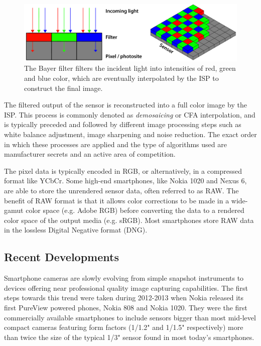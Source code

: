 \documentclass[thesis.tex]{subfiles}
\begin{document}
\begin{figure}[h]
\centering \includegraphics[width=\textwidth]{images/bayer}
\caption{The Bayer filter filters the incident light into intensities of red, green and blue color, which are eventually interpolated by the ISP to construct the final image. \label{figure:bayer}}
\end{figure}

The filtered output of the sensor is reconstructed into a full color image by the ISP. This process is commonly denoted as \textit{demosaicing} or CFA interpolation, and is typically preceded and followed by different image processing steps such as white balance adjustment, image sharpening and noise reduction. The exact order in which these processes are applied and the type of algorithms used are manufacturer secrets and an active area of competition.

The pixel data is typically encoded in RGB, or alternatively, in a compressed format like YCbCr. Some high-end smartphones, like Nokia 1020 and Nexus 6, are able to store the unrendered sensor data, often referred to as RAW. The benefit of RAW format is that it allows color corrections to be made in a wide-gamut color space (e.g. Adobe RGB) before converting the data to a rendered color space of the output media (e.g. sRGB). Most smartphones store RAW data in the lossless Digital Negative format (DNG).

\subsection{Recent Developments}\label{chapter:solutions}

Smartphone cameras are slowly evolving from simple snapshot instruments to devices offering near professional quality image capturing capabilities. The first steps towards this trend were taken during 2012-2013 when Nokia released its first PureView powered phones, Nokia 808 and Nokia 1020. They were the first commercially available smartphones to include sensors bigger than most mid-level compact cameras featuring form factors (1/1.2" and 1/1.5" respectively) more than twice the size of the typical 1/3" sensor found in most today's smartphones.
\end{document}
